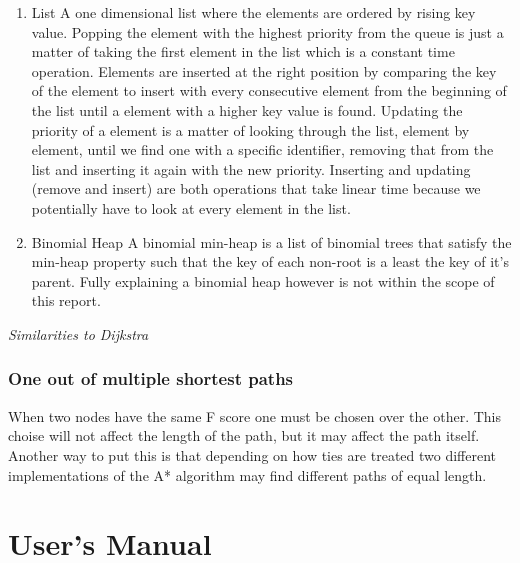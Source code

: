 \documentclass[12pt, a4paper]{article}
\begin{document}
\begin{enumerate}
\item{List}
A one dimensional list where the elements are ordered by rising key value. Popping the element with the highest priority from the queue is just a matter of taking the first element in the list which is a constant time operation. Elements are inserted at the right position by comparing the key of the element to insert with every consecutive element from the beginning of the list until a element with a higher key value is found. Updating the priority of a element is a matter of looking through the list, element by element, until we find one with a specific identifier, removing that from the list and inserting it again with the new priority. Inserting and updating (remove and insert) are both operations that take linear time because we potentially have to look at every element in the list.

\item{Binomial Heap}
A binomial min-heap is a list of binomial trees that satisfy the min-heap property such that the key of each non-root is a least the key of it's parent.  Fully explaining a binomial heap however is not within the scope of this report.

\end{enumerate}

\textit{Similarities to Dijkstra}




\subsubsection{One out of multiple shortest paths}

When two nodes have the same F score one must be chosen over the other. This
choise will not affect the length of the path, but it may affect the path
itself. Another way to put this is that depending on how ties are treated two
different implementations of the A* algorithm may find different paths of equal
length. \cite{astar2}


\section{User's Manual}
\end{document}
